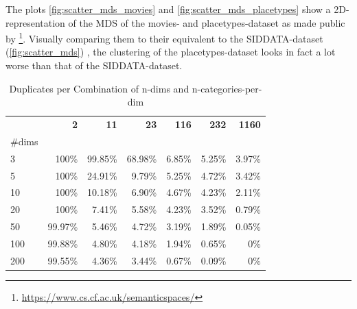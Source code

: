
The plots \ref{fig:scatter_mds_movies} and \ref{fig:scatter_mds_placetypes} show a 2D-representation of the MDS %
of the movies- and placetypes-dataset as made public by \textcite{Derrac2015}\footnote{\url{https://www.cs.cf.ac.uk/semanticspaces/}}. Visually comparing them to their equivalent to the SIDDATA-dataset (\autoref{fig:scatter_mds}) , the clustering of the placetypes-dataset looks in fact a lot worse than that of the SIDDATA-dataset.







\begin{table}
	\caption{Duplicates per Combination of n-dims and n-categories-per-dim}
	\begin{tabular}{lrrrrrr}
	\toprule
	 & \textbf{2} & \textbf{11} & \textbf{23} & \textbf{116} & \textbf{232} & \textbf{1160} \\
	\#dims &  &  &  &  &  &  \\
	\midrule
	3 & 100\% & 99.85\% & 68.98\% & 6.85\% & 5.25\% & 3.97\% \\
	5 & 100\% & 24.91\% & 9.79\% & 5.25\% & 4.72\% & 3.42\% \\
	10 & 100\% & 10.18\% & 6.90\% & 4.67\% & 4.23\% & 2.11\% \\
	20 & 100\% & 7.41\% & 5.58\% & 4.23\% & 3.52\% & 0.79\% \\
	50 & 99.97\% & 5.46\% & 4.72\% & 3.19\% & 1.89\% & 0.05\% \\
	100 & 99.88\% & 4.80\% & 4.18\% & 1.94\% & 0.65\% & 0\% \\
	200 & 99.55\% & 4.36\% & 3.44\% & 0.67\% & 0.09\% & 0\% \\
	\bottomrule
	\end{tabular}
\end{table}



